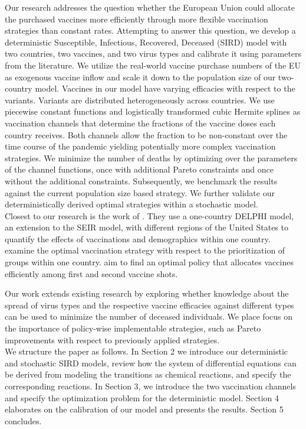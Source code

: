 Our research addresses the question whether the European Union could allocate the purchased vaccines more efficiently through more flexible vaccination strategies than constant rates. Attempting to answer this question, we develop a deterministic Susceptible, Infectious, Recovered, Deceased (SIRD) model with two countries, two vaccines, and two virus types and calibrate it using parameters from the literature. We utilize the real-world vaccine purchase numbers of the EU as exogenous vaccine inflow and scale it down to the population size of our two-country model. Vaccines in our model have varying efficacies with respect to the variants. Variants are distributed heterogeneously across countries. We use piecewise constant functions and logistically transformed cubic Hermite splines as vaccination channels that determine the fractions of the vaccine doses each country receives. Both channels allow the fraction to be non-constant over the time course of the pandemic yielding potentially more complex vaccination strategies. We minimize the number of deaths by optimizing over the parameters of the channel functions, once with additional Pareto constraints and once without the additional constraints. Subsequently, we benchmark the results against the current population size based strategy. We further validate our deterministically derived optimal strategies within a stochastic model.\\


Closest to our research is the work of \cite{Bertsimas.2020}. They use a one-country DELPHI model, an extension to the SEIR model, with different regions of the United States to quantify the effects of vaccinations and demographics within one country. \cite{Matrajt.2021} examine the optimal vaccination strategy with respect to the prioritization of groups within one country. \cite{Tuite.2021} aim to find an optimal policy that allocates vaccines efficiently among first and second vaccine shots.


Our work extends existing research by exploring whether knowledge about the spread of virus types and the respective vaccine efficacies against different types can be used to minimize the number of deceased individuals. We place focus on the importance of policy-wise implementable strategies, such as Pareto improvements with respect to previously applied strategies. \\

We structure the paper as follows. In Section 2 we introduce our deterministic and stochastic SIRD models, review how the system of differential equations can be derived from modeling the transitions as chemical reactions, and specify the corresponding reactions. In Section 3, we introduce the two vaccination channels and specify the optimization problem for the deterministic model. Section 4 elaborates on the calibration of our model and presents the results. Section 5 concludes. 


